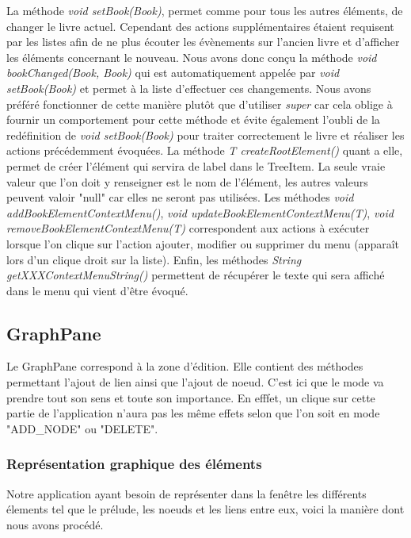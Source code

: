 				La méthode \textit{void setBook(Book)}, permet comme pour tous les autres éléments, de changer le livre actuel. Cependant des actions supplémentaires étaient requisent par les listes afin de ne plus écouter les évènements sur l'ancien livre et d'afficher les éléments concernant le nouveau. Nous avons donc conçu la méthode \textit{void bookChanged(Book, Book)} qui est automatiquement appelée par \textit{void setBook(Book)} et permet à la liste d'effectuer ces changements. Nous avons préféré fonctionner de cette manière plutôt que d'utiliser \textit{super} car cela oblige à fournir un comportement pour cette méthode et évite également l'oubli de la redéfinition de \textit{void setBook(Book)} pour traiter correctement le livre et réaliser les actions précédemment évoquées. La méthode \textit{T createRootElement()} quant a elle, permet de créer l'élément qui servira de label dans le TreeItem. La seule vraie valeur que l'on doit y renseigner est le nom de l'élément, les autres valeurs peuvent valoir "null" car elles ne seront pas utilisées. Les méthodes \textit{void addBookElementContextMenu()}, \textit{void updateBookElementContextMenu(T)}, \textit{void removeBookElementContextMenu(T)} correspondent aux actions à exécuter lorsque l'on clique sur l'action ajouter, modifier ou supprimer du menu (apparaît lors d'un clique droit sur la liste). Enfin, les méthodes \textit{String getXXXContextMenuString()} permettent de récupérer le texte qui sera affiché dans le menu qui vient d'être évoqué.

		\subsection{GraphPane}
			\label{subsec:GraphPane}

			Le GraphPane correspond à la zone d'édition. Elle contient des méthodes permettant l'ajout de lien ainsi que l'ajout de noeud. C'est ici que le mode va prendre tout son sens et toute son importance. En efffet, un clique sur cette partie de l'application n'aura pas les même effets selon que l'on soit en mode "ADD\_NODE" ou "DELETE".

			\subsubsection{Représentation graphique des éléments}

				Notre application ayant besoin de représenter dans la fenêtre les différents élements tel que le prélude, les noeuds et les liens entre eux, voici la manière dont nous avons procédé.

